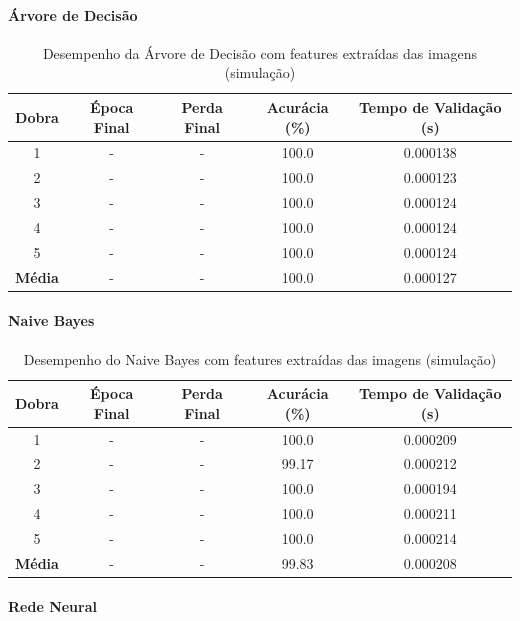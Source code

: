 \paragraph{Árvore de Decisão}

\begin{table}[H]
\centering
\caption{Desempenho da Árvore de Decisão com features extraídas das imagens (simulação)}
\label{tab:tree_feat_img_simu}
\begin{tabular}{ccccc}
\hline
\textbf{Dobra} & \textbf{Época Final} & \textbf{Perda Final} & \textbf{Acurácia (\%)} & \textbf{Tempo de Validação (s)} \\
\hline
1 & - & - & 100.0 & 0.000138 \\
2 & - & - & 100.0 & 0.000123 \\
3 & - & - & 100.0 & 0.000124 \\
4 & - & - & 100.0 & 0.000124 \\
5 & - & - & 100.0 & 0.000124 \\
\hline
\textbf{Média} & - & - & 100.0 & 0.000127 \\
\hline
\end{tabular} \fonte{}
\end{table}

\paragraph{Naive Bayes}

\begin{table}[H]
\centering
\caption{Desempenho do Naive Bayes com features extraídas das imagens (simulação)}
\label{tab:naive_feat_img_simu}
\begin{tabular}{ccccc}
\hline
\textbf{Dobra} & \textbf{Época Final} & \textbf{Perda Final} & \textbf{Acurácia (\%)} & \textbf{Tempo de Validação (s)} \\
\hline
1 & - & - & 100.0 & 0.000209 \\
2 & - & - & 99.17 & 0.000212 \\
3 & - & - & 100.0 & 0.000194 \\
4 & - & - & 100.0 & 0.000211 \\
5 & - & - & 100.0 & 0.000214 \\
\hline
\textbf{Média} & - & - & 99.83 & 0.000208 \\
\hline
\end{tabular} \fonte{}
\end{table} 

\paragraph{Rede Neural}

